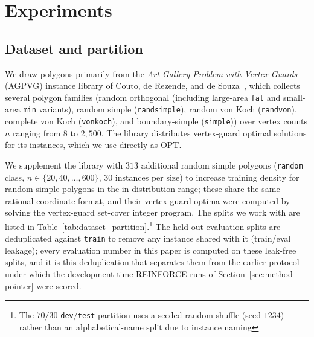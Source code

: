 \documentclass[11pt]{article}
\newcommand{\OPT}{\mathrm{OPT}}
\begin{document}
\section{Experiments}
\label{sec:experiments}

\subsection{Dataset and partition}
\label{sec:exp-dataset}

We draw polygons primarily from the \emph{Art Gallery Problem with Vertex Guards} (AGPVG) instance library of Couto, de Rezende, and de Souza~\cite{art-gallery-instances-page,Couto2011ExactAGP}, which collects several polygon families (random orthogonal (including large-area \texttt{fat} and small-area \texttt{min} variants), random simple (\texttt{randsimple}), random von Koch (\texttt{randvon}), complete von Koch (\texttt{vonkoch}), and boundary-simple (\texttt{simple})) over vertex counts $n$ ranging from $8$ to $2{,}500$. The library distributes vertex-guard optimal solutions for its instances, which we use directly as $\OPT$.

We supplement the library with $313$ additional random simple polygons (\texttt{random} class, $n \in \{20, 40, \dots, 600\}$, $30$ instances per size) to increase training density for random simple polygons in the in-distribution range; these share the same rational-coordinate format, and their vertex-guard optima were computed by solving the vertex-guard set-cover integer program. The splits we work with are listed in Table~\ref{tab:dataset_partition}.\footnote{The $70/30$ \texttt{dev}$/$\texttt{test} partition uses a seeded random shuffle (seed $1234$) rather than an alphabetical-name split due to instance naming} The held-out evaluation splits are deduplicated against \texttt{train} to remove any instance shared with it (train/eval leakage); every evaluation number in this paper is computed on these leak-free splits, and it is this deduplication that separates them from the earlier protocol under which the development-time REINFORCE runs of Section~\ref{sec:method-pointer} were scored.
\end{document}
